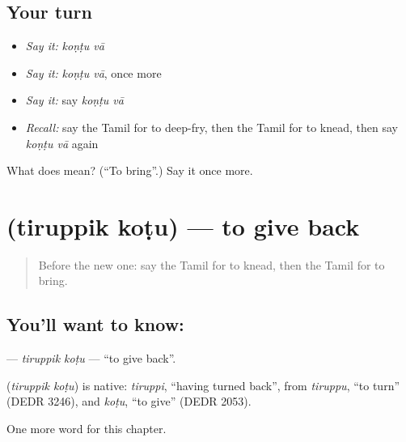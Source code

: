 \subsection*{Your turn}
\begin{itemize}
\raggedright
  \item \emph{Say it:} \emph{koṇṭu vā}
  \item \emph{Say it:} \emph{koṇṭu vā}, once more
  \item \emph{Say it:} say \emph{koṇṭu vā}
  \item \emph{Recall:} say the Tamil for to deep-fry, then the Tamil for to knead, then say \emph{koṇṭu vā} again
\end{itemize}

\begin{tcolorbox}[breakable,colback=teal!4,colframe=teal!35!black,title={Before you move on}]
What does   mean? (\textquotedblleft{}To bring\textquotedblright{}.) Say it once more.
\end{tcolorbox}
\section[\texorpdfstring{\ta{திருப்பிக்} \ta{கொடு} (tiruppik koṭu)}{திருப்பிக் கொடு (tiruppik koṭu)}]{  (tiruppik koṭu) — to give back}

\label{lesson:TA-C195-tiruppik-kotu}



\begin{quote}
Before the new one: say the Tamil for to knead, then the Tamil for to bring.
\end{quote}

\subsection*{You'll want to know:  }
\textbf{ } — \emph{tiruppik koṭu} — \textquotedblleft{}to give back\textquotedblright{}.

\begin{cousinweb}
\textbf{ } (\emph{tiruppik koṭu}) is native: \emph{tiruppi}, \textquotedblleft{}having turned back\textquotedblright{}, from \emph{tiruppu}, \textquotedblleft{}to turn\textquotedblright{} (DEDR 3246), and \emph{koṭu}, \textquotedblleft{}to give\textquotedblright{} (DEDR 2053).
\end{cousinweb}

\begin{grammarlens}[title={What you've built}]
One more word for this chapter.
\end{grammarlens}

